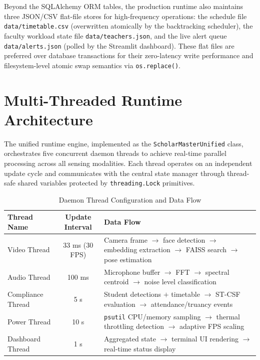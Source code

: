 \documentclass[12pt,a4paper,oneside]{report}
\begin{document}
Beyond the SQLAlchemy ORM tables, the production runtime also maintains three JSON/CSV flat-file stores for high-frequency operations: the schedule file \texttt{data/\allowbreak{}timetable.\allowbreak{}csv} (overwritten atomically by the backtracking scheduler), the faculty workload state file \texttt{data/\allowbreak{}teachers.\allowbreak{}json}, and the live alert queue \texttt{data/\allowbreak{}alerts.\allowbreak{}json} (polled by the Streamlit dashboard). These flat files are preferred over database transactions for their zero-latency write performance and filesystem-level atomic swap semantics via \texttt{os.replace()}.



\section{Multi-Threaded Runtime Architecture}
The unified runtime engine, implemented as the \texttt{ScholarMasterUnified} class, orchestrates five concurrent daemon threads to achieve real-time parallel processing across all sensing modalities. Each thread operates on an independent update cycle and communicates with the central state manager through thread-safe shared variables protected by \texttt{threading.Lock} primitives.

\begin{table}[htbp]
\caption{Daemon Thread Configuration and Data Flow}
\centering
\small
{}
\setlength{\tabcolsep}{4pt}
\begin{tabular}{@{}l c p{2.8in}@{}}
\hline
\textbf{Thread Name} & \textbf{Update Interval} & \textbf{Data Flow} \\ \hline
Video Thread & 33 ms (30 FPS) & Camera frame $\to$ face detection $\to$ embedding extraction $\to$ FAISS search $\to$ pose estimation \\
Audio Thread & 100 ms & Microphone buffer $\to$ FFT $\to$ spectral centroid $\to$ noise level classification \\
Compliance Thread & 5 s & Student detections $+$ timetable $\to$ ST-CSF evaluation $\to$ attendance/truancy events \\
Power Thread & 10 s & \texttt{psutil} CPU/memory sampling $\to$ thermal throttling detection $\to$ adaptive FPS scaling \\
Dashboard Thread & 1 s & Aggregated state $\to$ terminal UI rendering $\to$ real-time status display \\ \hline
\end{tabular}
\label{tab:thread_architecture}
\end{table}
\end{document}

